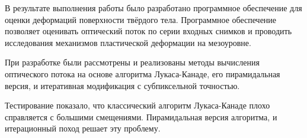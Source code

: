 \setcounter{figure}{0}

В результате выполнения работы было разработано программное обеспечение для оценки деформаций поверхности твёрдого тела. Программное обеспечение позволяет оценивать оптический поток по серии входных снимков и проводить исследования механизмов пластической деформации на мезоуровне. %

При разработке были рассмотрены и реализованы методы вычисления оптического потока на основе алгоритма Лукаса-Канаде, его пирамидальная версия, и итеративная модификация с субпиксельной точностью.

Тестирование показало, что классический алгоритм Лукаса-Канаде плохо справляется с большими смещениями. Пирамидальная версия алгоритма, и итерационный поход решает эту проблему. %
